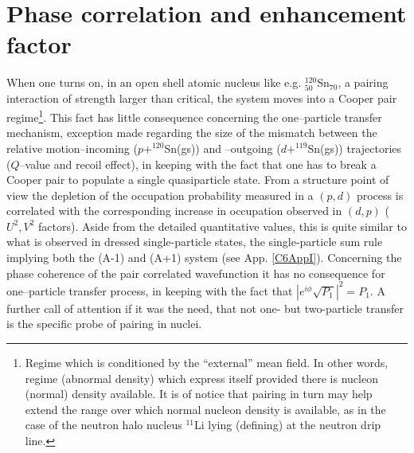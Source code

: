 \section{Phase correlation and enhancement factor}\label{S4.3}
When one turns on, in an open shell atomic nucleus like e.g. $^{120}_{50}$Sn$_{70}$, a pairing interaction of strength larger than critical, the system moves into a Cooper pair regime\footnote{Regime which is conditioned by the ``external'' mean field. In other words, regime (abnormal density) which express itself provided there is nucleon (normal) density available. It is of notice that pairing in turn may help extend the range over which normal nucleon density is available, as in the case of the neutron halo nucleus $^{11}$Li lying (defining) at the neutron drip line.}. This fact has little  consequence concerning the one--particle transfer mechanism, exception made regarding the size of the mismatch between the relative motion--incoming ($p+^{120}$Sn(gs)) and --outgoing ($d+^{119}$Sn(gs)) trajectories ($Q$--value and recoil effect), in keeping with the fact that one has to break a Cooper pair to populate a single  quasiparticle state. From a structure point of view the depletion of the occupation probability measured in a $(p,d)$ process is correlated with the corresponding increase in occupation observed in $(d,p)$ ($U^2,V^2$ factors). Aside  from the detailed quantitative values, this is quite similar to what is observed in dressed single-particle states, the single-particle sum rule implying both the (A-1) and (A+1) system (see App. \ref{C6AppI}). Concerning the phase coherence of the pair correlated wavefunction it has no consequence for one--particle transfer process, in keeping with the fact that $|e^{i\phi}\sqrt{P_1}|^2=P_1$. A further call of attention if it was the need, that not one- but two-particle transfer is the specific probe of pairing in nuclei.


